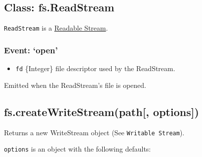 \begin{Shaded}
\begin{Highlighting}[]
\NormalTok{(}\NormalTok{, \{}\NormalTok{: }\NormalTok{, }\NormalTok{: }\NormalTok{\});}
\end{Highlighting}
\end{Shaded}

\subsection{Class: fs.ReadStream}\label{class-fs.readstream}

\texttt{ReadStream} is a
\href{stream.html\#stream_class_stream_readable}{Readable Stream}.

\subsubsection{\texorpdfstring{Event:
`open'}{Event: open}}\label{event-open}

\begin{itemize}
\itemsep1pt\parskip0pt
\item
  \texttt{fd} \{Integer\} file descriptor used by the ReadStream.
\end{itemize}

Emitted when the ReadStream's file is opened.

\subsection{fs.createWriteStream(path{[},
options{]})}\label{fs.createwritestreampath-options}

Returns a new WriteStream object (See \texttt{Writable\ Stream}).

\texttt{options} is an object with the following defaults:

\begin{Shaded}
\begin{Highlighting}[]
\NormalTok{\{ }\NormalTok{: }\NormalTok{,}
  \NormalTok{: }\NormalTok{,}
  \NormalTok{: }\NormalTok{,}
  \NormalTok{: } \NormalTok{\}}
\end{Highlighting}
\end{Shaded}

